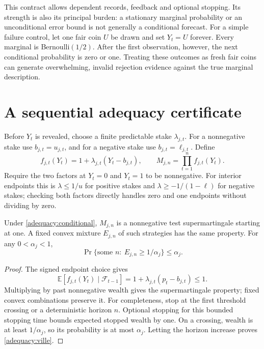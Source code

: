 This contract allows dependent records, feedback and optional stopping. Its
strength is also its principal burden: a stationary marginal probability or
an unconditional error bound is not generally a conditional forecast. For a
simple failure control, let one fair coin $U$ be drawn and set $Y_t=U$ forever.
Every marginal is Bernoulli$(1/2)$. After the first observation, however, the
next conditional probability is zero or one. Treating these outcomes as fresh
fair coins can generate overwhelming, invalid rejection evidence against the
true marginal description.

\section{A sequential adequacy certificate}

Before $Y_t$ is revealed, choose a finite predictable stake $\lambda_{j,t}$.
For a nonnegative stake use $b_{j,t}=u_{j,t}$, and for a negative stake use
$b_{j,t}=\ell_{j,t}$. Define
\begin{equation}
 f_{j,t}(Y_t)=1+\lambda_{j,t}(Y_t-b_{j,t}),
 \qquad M_{j,n}=\prod_{t=1}^n f_{j,t}(Y_t).
 \label{adequacy:bet}
\end{equation}
Require the two factors at $Y_t=0$ and $Y_t=1$ to be nonnegative. For interior
endpoints this is $\lambda\leq1/u$ for positive stakes and
$\lambda\geq-1/(1-\ell)$ for negative stakes; checking both factors directly
handles zero and one endpoints without dividing by zero.

\begin{proposition}
\label{adequacy:anytime}
Under \eqref{adequacy:conditional}, $M_{j,n}$ is a nonnegative test
supermartingale starting at one. A fixed convex mixture $E_{j,n}$ of such
strategies has the same property. For any $0<\alpha_j<1$,
\begin{equation}
 \Pr\{\text{some }n:\ E_{j,n}\geq1/\alpha_j\}\leq\alpha_j.
 \label{adequacy:ville}
\end{equation}
\end{proposition}
\begin{proof}
The signed endpoint choice gives
\[
 \mathbb E[f_{j,t}(Y_t)\mid\mathcal F_{t-1}]
 =1+\lambda_{j,t}(p_t-b_{j,t})\leq1.
\]
Multiplying by past nonnegative wealth gives the supermartingale property;
fixed convex combinations preserve it. For completeness, stop at the first
threshold crossing or a deterministic horizon $n$. Optional stopping for this
bounded stopping time bounds expected stopped wealth by one. On a crossing,
wealth is at least $1/\alpha_j$, so its probability is at most $\alpha_j$.
Letting the horizon increase proves \eqref{adequacy:ville}.
\end{proof}

